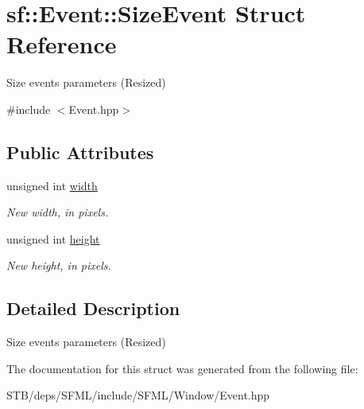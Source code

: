 \hypertarget{structsf_1_1_event_1_1_size_event}{\section{sf\+:\+:Event\+:\+:Size\+Event Struct Reference}
\label{structsf_1_1_event_1_1_size_event}
}


Size events parameters (Resized)  




{\ttfamily \#include $<$Event.\+hpp$>$}

\subsection*{Public Attributes}
\begin{DoxyCompactItemize}
\item 
\hypertarget{structsf_1_1_event_1_1_size_event_a20ea1b78c9bb1604432f8f0067bbfd94}{unsigned int \hyperlink{structsf_1_1_event_1_1_size_event_a20ea1b78c9bb1604432f8f0067bbfd94}{width}}\label{structsf_1_1_event_1_1_size_event_a20ea1b78c9bb1604432f8f0067bbfd94}

\begin{DoxyCompactList}\small\item\em New width, in pixels. \end{DoxyCompactList}\item 
\hypertarget{structsf_1_1_event_1_1_size_event_af0f76a599d5f48189cb8d78d4e5facdb}{unsigned int \hyperlink{structsf_1_1_event_1_1_size_event_af0f76a599d5f48189cb8d78d4e5facdb}{height}}\label{structsf_1_1_event_1_1_size_event_af0f76a599d5f48189cb8d78d4e5facdb}

\begin{DoxyCompactList}\small\item\em New height, in pixels. \end{DoxyCompactList}\end{DoxyCompactItemize}


\subsection{Detailed Description}
Size events parameters (Resized) 

The documentation for this struct was generated from the following file\+:\begin{DoxyCompactItemize}
\item 
S\+T\+B/deps/\+S\+F\+M\+L/include/\+S\+F\+M\+L/\+Window/Event.\+hpp\end{DoxyCompactItemize}
